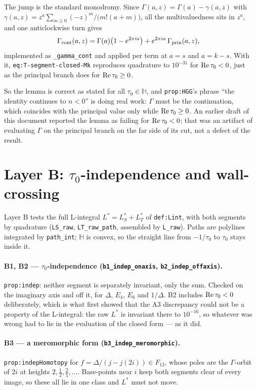 \documentclass[11pt]{article}
\newcommand{\HH}{\mathbb{H}}
\newcommand{\code}[1]{\texttt{#1}}
\begin{document}
The jump is the standard monodromy. Since $\Gamma(a,z)=\Gamma(a)-\gamma(a,z)$ with
$\gamma(a,z)=z^a\sum_{m\ge0}(-z)^m/\big(m!(a+m)\big)$, all the multivaluedness sits in $z^a$,
and one anticlockwise turn gives
\[
\Gamma_{\rm cont}(a,z)=\Gamma(a)\big(1-e^{2\pi ia}\big)+e^{2\pi ia}\,\Gamma_{\rm prin}(a,z),
\]
implemented as \code{\_gamma\_cont} and applied per term at $a=s$ and $a=k-s$. With it,
\code{eq:T-segment-closed-Mk} reproduces quadrature to $10^{-31}$ for ${\rm Re}\,\tau_0<0$,
just as the principal branch does for ${\rm Re}\,\tau_0\ge0$.

So the lemma is correct as stated for all $\tau_0\in\HH$, and \code{prop:HGG}'s phrase ``the
identity continues to $n<0$'' is doing real work: $\Gamma$ must be the continuation, which
coincides with the principal value only while ${\rm Re}\,\tau_0\ge0$. An earlier draft of this
document reported the lemma as failing for ${\rm Re}\,\tau_0<0$; that was an artifact of
evaluating $\Gamma$ on the principal branch on the far side of its cut, not a defect of the
result.

\section{Layer B: $\tau_0$-independence and wall-crossing}

Layer B tests the full L-integral $L^*=L^*_S+L^*_T$ of \code{def:Lint}, with both segments by
quadrature (\code{LS\_raw}, \code{LT\_raw\_path}, assembled by \code{L\_raw}). Paths are
polylines integrated by \code{path\_int}; $\HH$ is convex, so the straight line from $-1/\tau_0$
to $\tau_0$ stays inside it.

\paragraph{B1, B2 --- $\tau_0$-independence (\code{b1\_indep\_onaxis}, \code{b2\_indep\_offaxis}).}
\code{prop:indep}: neither segment is separately invariant, only the sum. Checked on the
imaginary axis and off it, for $\Delta$, $E_4$, $E_6$ and $1/\Delta$. B2 includes
${\rm Re}\,\tau_0<0$ deliberately, which is what first showed that the A3 discrepancy could not
be a property of the L-integral: the raw $L^*$ is invariant there to $10^{-16}$, so whatever was
wrong had to lie in the evaluation of the closed form --- as it did.

\paragraph{B3 --- a meromorphic form (\code{b3\_indep\_meromorphic}).}
\code{prop:indepHomotopy} for $f=\Delta/(j-j(2i))\in F_{12}$, whose poles are the $\Gamma$-orbit
of $2i$ at heights $2,\tfrac12,\tfrac25,\dots$. Base-points near $i$ keep both segments clear of
every image, so these all lie in one class and $L^*$ must not move.
\end{document}
